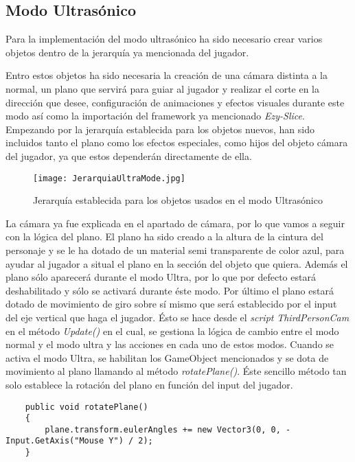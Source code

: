 \subsection{Modo Ultrasónico}

Para la implementación del modo ultrasónico ha sido necesario crear varios objetos dentro de la jerarquía ya mencionada del jugador. 

Entro estos objetos ha sido necesaria la creación de una cámara distinta a la normal, un plano que servirá para guiar al jugador y realizar el corte en la dirección que desee, configuración de animaciones y efectos visuales durante este modo así como la importación del framework ya mencionado \textit{Ezy-Slice}. Empezando por la jerarquía establecida para los objetos nuevos, han sido incluidos tanto el plano como los efectos especiales, como hijos del objeto cámara del jugador, ya que estos dependerán directamente de ella.

\begin{figure}[H]
    \centering
    \texttt{[image: JerarquiaUltraMode.jpg]}
    \caption{Jerarquía establecida para los objetos usados en el modo Ultrasónico}
\end{figure}

La cámara ya fue explicada en el apartado de cámara, por lo que vamos a seguir con la lógica del plano. El plano ha sido creado a la altura de la cintura del personaje y se le ha dotado de un material semi transparente de color azul, para ayudar al jugador a situal el plano en la sección del objeto que quiera. Además el plano sólo aparecerá durante el modo Ultra, por lo que por defecto estará deshabilitado y sólo se activará durante éste modo. Por último el plano estará dotado de movimiento de giro sobre sí mismo que será establecido por el input del eje vertical que haga el jugador. Ésto se hace desde el \textit{script} \textit{ThirdPersonCam} en el método \textit{Update()} en el cual, se gestiona la lógica de cambio entre el modo normal y el modo ultra y las acciones en cada uno de estos modos. Cuando se activa el modo Ultra, se habilitan los GameObject mencionados y se dota de movimiento al plano llamando al método \textit{rotatePlane()}. Éste sencillo método tan solo establece la rotación del plano en función del input del jugador.

\begin{lstlisting}
    public void rotatePlane()
    {
        plane.transform.eulerAngles += new Vector3(0, 0, -Input.GetAxis("Mouse Y") / 2);
    }
\end{lstlisting}

